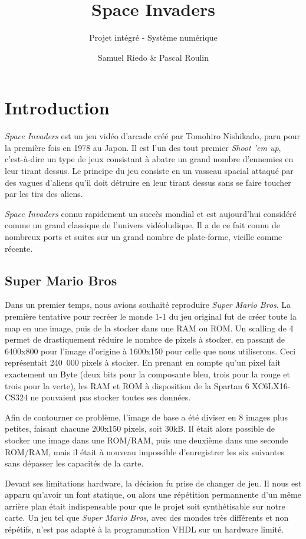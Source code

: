 \documentclass[french]{nakrule}
\author{Samuel Riedo \& Pascal Roulin}
\title{Space Invaders}
\subtitle{Projet intégré - Système numérique}
\begin{document}

\chapter{Introduction}
\label{introduction}

\emph{Space Invaders} est un jeu vidéo d'arcade créé par Tomohiro Nishikado, paru pour
la première fois en 1978 au Japon. Il est l'un des tout premier \emph{Shoot 'em
  up}, c'est-à-dire un type de jeux consistant à abatre un grand nombre d'ennemies en
leur tirant dessus. Le principe du jeu consiste en un vasseau spacial attaqué
par des vagues d'aliens qu'il doit détruire en leur tirant dessus sans se faire
toucher par les tirs des aliens.

\emph{Space Invaders} connu rapidement un succès mondial et est aujourd'hui
considéré comme un grand classique de l'univers vidéoludique. Il a de ce fait
connu de nombreux ports et suites sur un grand nombre de plate-forme, vieille
comme récente.

\section{Super Mario Bros}
\label{sec:mario}

Dans un premier temps, nous avions souhaité reproduire \emph{Super Mario Bros}.
La première tentative pour recréer le monde 1-1 du jeu original fut de créer
toute la map en une image, puis de la stocker dans une RAM ou ROM.
Un scalling de 4 permet de drastiquement réduire le nombre de pixels à stocker,
en passant de 6400x800 pour l'image d'origine à 1600x150 pour celle que nous
utiliserons.
Ceci représentait \si{240.000} pixels à stocker. En prenant en compte qu'un pixel
fait exactement un Byte (deux bits pour la composante bleu, trois pour la rouge
et trois pour la verte), les RAM et ROM à disposition de la Spartan 6
XC6LX16-CS324 ne pouvaient pas stocker toutes ses données.

Afin de contourner ce problème, l'image de base a été diviser en 8 images plus
petites, faisant chacune 200x150 pixels, soit 30kB. Il était alors possible de
stocker une image dans une ROM/RAM, puis une deuxième dans une seconde ROM/RAM,
mais il était à nouveau impossible d'enregistrer les six suivantes sans dépasser
les capacités de la carte.

Devant ses limitations hardware, la décision fu prise de changer de jeu. Il nous
est apparu qu'avoir un font statique, ou alors une répétition permannente d'un
même arrière plan était indispensable pour que le projet soit synthétisable sur
notre carte. Un jeu tel que \emph{Super Mario Bros}, avec des mondes très
différents et non répétifs, n'est pas adapté à la programmation VHDL sur un
hardware limité.
\end{document}
